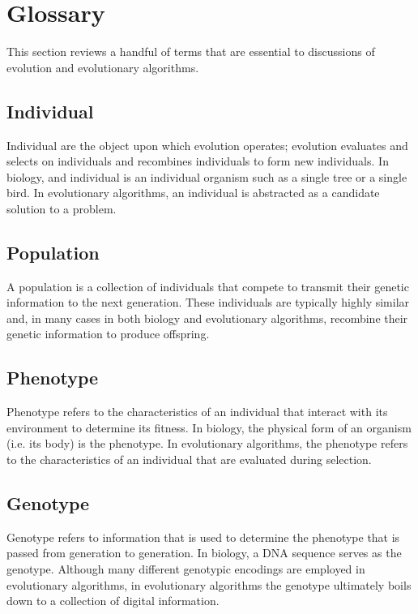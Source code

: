 \section{Glossary} \label{sec:glossary}

This section reviews a handful of terms that are essential to discussions of evolution and evolutionary algorithms.

\subsection{Individual}

Individual are the object upon which evolution operates; evolution evaluates and selects on individuals and recombines individuals to form new individuals. In biology, and individual is an individual organism such as a single tree or a single bird. In evolutionary algorithms, an individual is abstracted as a candidate solution to a problem.

\subsection{Population}

A population is a collection of individuals that compete to transmit their genetic information to the next generation. These individuals are typically highly similar and, in many cases in both biology and evolutionary algorithms, recombine their genetic information to produce offspring.

\subsection{Phenotype}

Phenotype refers to the characteristics of an individual that interact with its environment to determine its fitness. In biology, the physical form of an organism (i.e. its body) is the phenotype. In evolutionary algorithms, the phenotype refers to the characteristics of an individual that are evaluated during selection.

\subsection{Genotype}

Genotype refers to information that is used to determine the phenotype that is passed from generation to generation. In biology, a DNA sequence serves as the genotype. Although many different genotypic encodings are employed in evolutionary algorithms, in evolutionary algorithms the genotype ultimately boils down to a collection of digital information.

